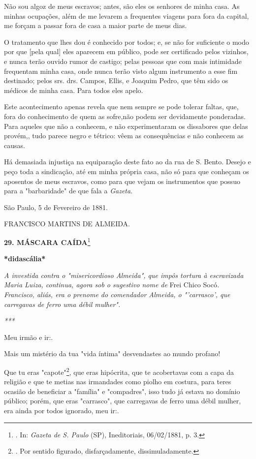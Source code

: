 Não sou algoz de meus escravos; antes, são eles os senhores de minha
casa. As minhas ocupações, além de me levarem a frequentes viagens para
fora da capital, me forçam a passar fora de casa a maior parte de meus
dias.

O tratamento que lhes dou é conhecido por todos; e, se não for
suficiente o modo por que {[}pela qual{]} eles aparecem em público, pode
ser certificado pelos vizinhos, e nunca terão ouvido rumor de castigo;
pelas pessoas que com mais intimidade frequentam minha casa, onde nunca
terão visto algum instrumento a esse fim destinado; pelos srs. drs.
Campos, Ellis, e Joaquim Pedro, que têm sido os médicos de minha casa.
Para todos eles apelo.

Este acontecimento apenas revela que nem sempre se pode tolerar faltas,
que, fora do conhecimento de quem as sofre,não podem ser devidamente
ponderadas. Para aqueles que não a conhecem, e não experimentaram os
dissabores que delas provém,, tudo parece negro e tétrico: vêem as
consequências e não conhecem as causas.

Há demasiada injustiça na equiparação deste fato ao da rua de S. Bento.
Desejo e peço toda a sindicação, até em minha própria casa, não só para
que conheçam os aposentos de meus escravos, como para que vejam os
instrumentos que possuo para a "barbaridade" de que fala a
\emph{Gazeta}.

São Paulo, 5 de Fevereiro de 1881.

FRANCISCO MARTINS DE ALMEIDA.

\textbf{29. MÁSCARA CAÍDA}\footnote{. In: \emph{Gazeta de S. Paulo}
  (SP), Ineditoriais, 06/02/1881, p. 3.}

\textbf{*didascália*}

\emph{A investida contra o "misericordioso Almeida", que impôs tortura à
escravizada Maria Luiza, continua, agora sob o sugestivo nome de} Frei
Chico Socó\emph{. Francisco, aliás, era o prenome do comendador Almeida,
o "'carrasco', que carregavas de ferro uma débil mulher".}

\emph{***}

Meu irmão e ir:.

Mais um mistério da tua "vida íntima" desvendastes ao mundo profano!

Que tu eras "capote"\footnote{. Por sentido figurado, disfarçadamente,
  dissimuladamente.}, que eras hipócrita, que te acobertavas com a capa
da religião e que te metias nas irmandades como piolho em costura, para
teres ocasião de beneficiar a "família" e "compadres", isso tudo já
estava no domínio público; porém, que eras "carrasco", que carregavas de
ferro uma débil mulher, era ainda por todos ignorado, meu ir:.

